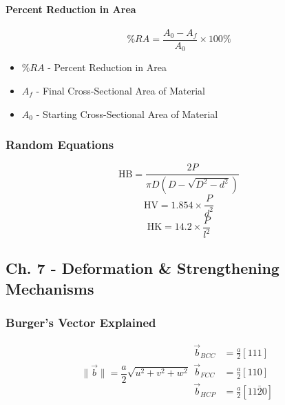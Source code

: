 			\paragraph{Percent Reduction in Area} \label{par:Percent Reduction Area}
				\begin{equation} \label{eq:Percent Reduction Area}
					\%RA = \frac{A_{0} - A_{f}}{A_{0}} \times 100\%
				\end{equation}
				\begin{itemize}[noitemsep]
					\item $\%RA$ - Percent Reduction in Area
					\item $A_{f}$ - Final Cross-Sectional Area of Material
					\item $A_{0}$ - Starting Cross-Sectional Area of Material
				\end{itemize}
		
		\subsubsection{Random Equations}
			\begin{equation}
				\text{HB} = \frac{2P}{\pi D \left( D - \sqrt{D^{2} - d^{2}} \right)}
			\end{equation}
			\begin{equation}
				\text{HV} = 1.854 \times \frac{P}{d^{2}}
			\end{equation}
			\begin{equation}
				\text{HK} = 14.2 \times \frac{P}{l^{2}}
			\end{equation}
			
	\subsection{Ch. 7 - Deformation \& Strengthening Mechanisms} \label{subsec:Ch 7}
		\subsubsection{Burger's Vector Explained} \label{subsubsec:Burgers Vector Explained}
			\begin{equation}
				\lVert \vec{b} \rVert = \frac{a}{2} \sqrt{u^{2} + v^{2} + w^{2}}
				\begin{aligned}
					\vec{b}_{BCC} &= \frac{a}{2} \left[ 111 \right] \\
					\vec{b}_{FCC} &= \frac{a}{2} \left[ 110 \right] \\
					\vec{b}_{HCP} &= \frac{a}{2} \left[ 11 \bar{2} 0 \right] \\
				\end{aligned}
			\end{equation}